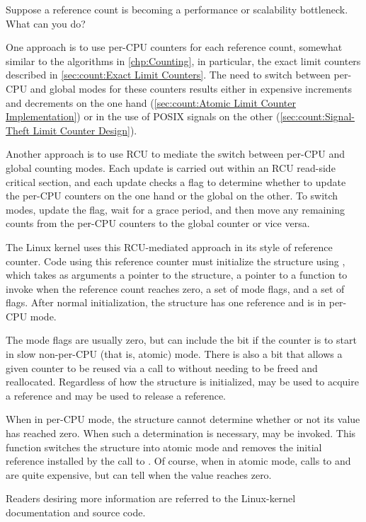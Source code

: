Suppose a reference count is becoming a performance or scalability
bottleneck.
What can you do?

One approach is to use per-CPU counters for each reference count,
somewhat similar to the algorithms in \cref{chp:Counting}, in particular,
the exact limit counters described in
\cref{sec:count:Exact Limit Counters}.
The need to switch between per-CPU and global modes for these counters
results either in expensive increments and decrements on the one hand
(\cref{sec:count:Atomic Limit Counter Implementation})
or in the use of POSIX signals on the other
(\cref{sec:count:Signal-Theft Limit Counter Design}).

Another approach is to use RCU to mediate the switch between per-CPU
and global counting modes.
Each update is carried out within an RCU read-side critical section,
and each update checks a flag to determine whether to update the
per-CPU counters on the one hand or the global on the other.
To switch modes, update the flag, wait for a grace period, and then
move any remaining counts from the per-CPU counters to the global
counter or vice versa.

The Linux kernel uses this RCU-mediated approach in its 
style of reference counter.
Code using this reference counter must initialize the 
structure using , which takes as arguments
a pointer to the structure, a pointer to a function to invoke when
the reference count reaches zero, a set of mode flags, and a set
of   flags.
After normal initialization, the structure has one reference and
is in per-CPU mode.

The mode flags are usually zero, but can include the
 bit if the counter is to start in slow
non-per-CPU (that is, atomic) mode.
There is also a  bit that allows
a given  counter to be reused via a call to
 without needing to be freed and reallocated.
Regardless of how the  structure is initialized,
 may be used to acquire a reference and
 may be used to release a reference.

When in per-CPU mode, the  structure cannot determine whether
or not its value has reached zero.
When such a determination is necessary,  may
be invoked.
This function switches the structure into atomic mode and removes the
initial reference installed by the call to .
Of course, when in atomic mode, calls to  and
 are quite expensive, but 
can tell when the value reaches zero.

Readers desiring more  information are referred to
the Linux-kernel documentation and source code.

